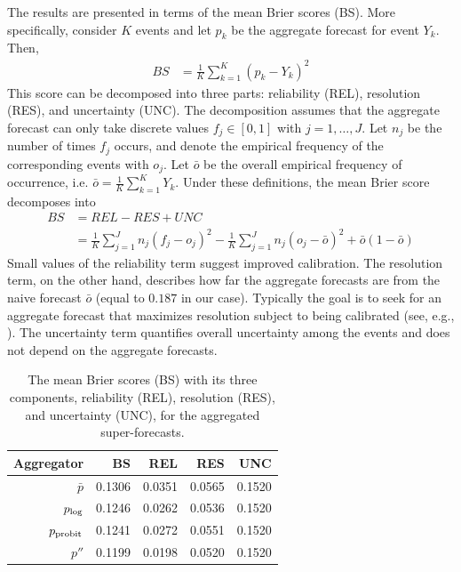\documentclass[11pt]{article}
\theoremstyle{definition}
\theoremstyle{definition}
\def\probit{p_{\rm probit}}
\def\plog{p_{\rm log}}
\begin{document}
 
The results are presented in terms of the mean Brier scores (BS). More specifically, consider $K$
events and let $p_k$ be the aggregate forecast for event $Y_k$. Then,
 \begin{align*}
BS &= \frac{1}{K} \sum_{k=1}^K (p_k - Y_k)^2
 \end{align*}
 This score can be decomposed into three parts: reliability (REL),
resolution (RES), and uncertainty (UNC). The decomposition assumes
that the aggregate forecast can only take discrete values $f_j \in
[0,1]$ with $j = 1, \dots, J$. Let $n_j$ be the number of times $f_j$
occurs, and denote the empirical frequency of the corresponding events
with $o_j$.  Let $\bar{o}$ be the overall empirical frequency of
occurrence, i.e. $\bar{o} = \frac{1}{K} \sum_{k=1}^K Y_k$. Under these definitions, the
mean Brier score decomposes into
 \begin{align*}
BS &= REL - RES + UNC\\
&= \frac{1}{K} \sum_{j=1}^J n_j (f_j - o_j)^2 - \frac{1}{K} \sum_{j=1}^J n_j (o_j - \bar{o})^2 + \bar{o}(1-\bar{o})
 \end{align*}
 Small values of the reliability term suggest improved
calibration. The resolution term, on the other hand, describes how far
the aggregate forecasts are from the naive forecast $\bar{o}$ (equal to $0.187$ in our case). Typically the goal is
to seek for an aggregate forecast that maximizes resolution subject to
being calibrated (see, e.g., \citealt{gneiting2007probabilistic}). The
uncertainty term quantifies overall uncertainty among the events and
does not depend on the aggregate forecasts.
 
\begin{table}[t]
\centering
\begin{tabular}{rrrrr}
  \hline
Aggregator & BS & REL & RES & UNC \\ 
  \hline
$\bar{p}$ & 0.1306 & 0.0351 & 0.0565 & 0.1520 \\ 
 $\plog$ & 0.1246 & 0.0262 & 0.0536 & 0.1520 \\ 
 $\probit$ & 0.1241 & 0.0272 & 0.0551 & 0.1520 \\ 
 $p''$ & 0.1199 & 0.0198 & 0.0520 & 0.1520 \\ 
   \hline
\end{tabular}
\caption{The mean Brier scores (BS) with its three components, reliability (REL), resolution (RES), and uncertainty (UNC), for the aggregated super-forecasts.}
\label{BrierTable}
\end{table}
\end{document}
